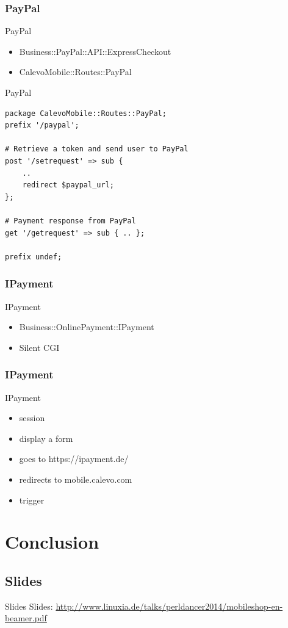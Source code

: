 \subsubsection{PayPal}
\begin{frame}[fragile]{PayPal}
\begin{itemize}
\item Business::PayPal::API::ExpressCheckout
\item CalevoMobile::Routes::PayPal
\end{itemize}
\end{frame}

\begin{frame}[fragile]{PayPal}
\begin{lstlisting}
package CalevoMobile::Routes::PayPal;
prefix '/paypal';

# Retrieve a token and send user to PayPal
post '/setrequest' => sub { 
    .. 
    redirect $paypal_url;
};

# Payment response from PayPal
get '/getrequest' => sub { .. };

prefix undef;
\end{lstlisting}
\end{frame}

\subsubsection{IPayment}
\begin{frame}[fragile]{IPayment}
\begin{itemize}
\item Business::OnlinePayment::IPayment
\item Silent CGI
\end{itemize}
\end{frame}

\subsubsection{IPayment}
\begin{frame}[fragile]{IPayment}
\begin{itemize}
\item session
\item display a form
\item goes to https://ipayment.de/
\item redirects to mobile.calevo.com
\item trigger
\end{itemize}
\end{frame}

\section{Conclusion}

\subsection{Slides}

\begin{frame}{Slides}
Slides:
\url{http://www.linuxia.de/talks/perldancer2014/mobileshop-en-beamer.pdf}
\end{frame}




